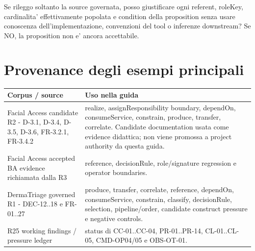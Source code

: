 \documentclass[11pt,a4paper]{article}
\begin{document}
\begin{ddtacore}[title={Ultima domanda prima di accettare una proposition}]
Se rileggo soltanto la source governata, posso giustificare ogni referent, roleKey, cardinalita' effettivamente popolata e condition della proposition senza usare conoscenza dell'implementazione, convenzioni del tool o inferenze downstream? Se NO, la proposition non e' ancora accettabile.
\end{ddtacore}

\section{Provenance degli esempi principali}
\begin{tabularx}{\textwidth}{L{48mm}Y}
\toprule
\textbf{Corpus / source} & \textbf{Uso nella guida} \\
\midrule
Facial Access candidate R2 - D-3.1, D-3.4, D-3.5, D-3.6, FR-3.2.1, FR-3.4.2 & realize, assignResponsibility boundary, dependOn, consumeService, constrain, produce, transfer, correlate. Candidate documentation usata come evidence didattica; non viene promossa a project authority da questa guida. \\
Facial Access accepted BA evidence richiamata dalla R3 & reference, decisionRule, role/signature regression e operator boundaries. \\
DermaTriage governed R1 - DEC-12..18 e FR-01..27 & produce, transfer, correlate, reference, dependOn, consumeService, constrain, classify, decisionRule, selection, pipeline/order, candidate construct pressure e negative controls. \\
R25 working findings / pressure ledger & status di CC-01..CC-04, PR-01..PR-14, CL-01..CL-05, CMD-OP04/05 e OBS-OT-01. \\
\bottomrule
\end{tabularx}
\end{document}
